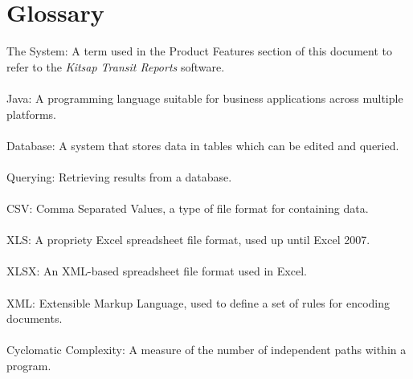 \section{Glossary}
The System: A term used in the Product Features section of this document to refer to the \textit{Kitsap Transit Reports} software.\\\\
Java: A programming language suitable for business applications across multiple platforms.\\\\
Database: A system that stores data in tables which can be edited and queried.\\\\
Querying: Retrieving results from a database.\\\\
CSV: Comma Separated Values, a type of file format for containing data.\\\\
XLS: A propriety Excel spreadsheet file format, used up until Excel 2007.\\\\
XLSX: An XML-based spreadsheet file format used in Excel.\\\\
XML: Extensible Markup Language, used to define a set of rules for encoding documents.\\\\
Cyclomatic Complexity: A measure of the number of independent paths within a program.
